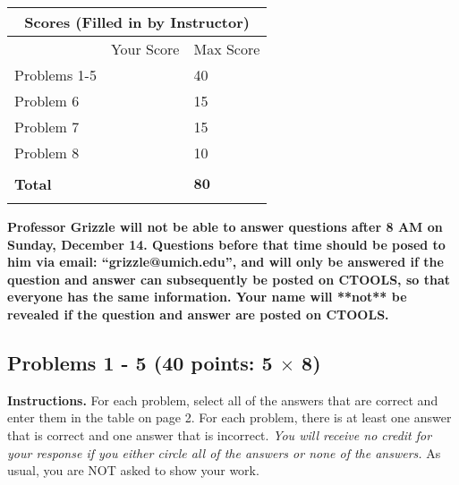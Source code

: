 \documentclass[letterpaper]{article}
\begin{document}
\begin{center}
\begin{tabular}{|p{2in}|p{1in}|p{1in}|}
\hline
\multicolumn{3}{|c|}{\textbf{Scores (Filled in by Instructor)}}\\
\hline
 & Your Score& Max Score \\
\hline
Problems 1-5 &  &   40\\
\hline
Problem 6 &  &   15\\
\hline
Problem 7 &  &   15\\
\hline
Problem 8 &  &   10\\
\hline
& & \\
\hline
\textbf{Total} &  &   $\mathbf{80}$\\
\hline
& & \\
\hline
%
\end{tabular}
\end{center}

\newpage

%
%
%

\newpage

\vspace*{8cm}
\begin{center}
 \textbf{ \LARGE Professor Grizzle will not be able to answer questions after 8 AM on Sunday, December 14.  Questions before that time should be posed to him via email: ``grizzle@umich.edu'', and will only be answered if the question and answer can subsequently be posted on CTOOLS, so that everyone has the same information. Your name will **not** be revealed if the question and answer are posted on CTOOLS. }
\end{center}
\newpage



\subsection*{Problems 1 - 5 {\rm (40 points: 5 $\times$ 8)}}

{\bf Instructions.} For each problem, select all of the answers that are correct and enter them in the table on page 2. For each problem, there is at least one answer that is correct and one answer that is incorrect. \textit{You will receive no credit for your response if you either circle all of the answers or none of the answers.} As usual, you are NOT asked to show your work.
\end{document}
